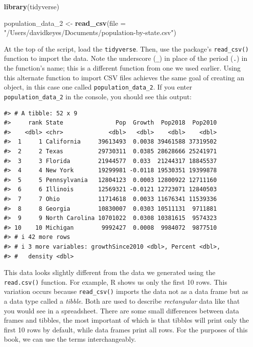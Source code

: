 \documentclass[
]{book}
\newenvironment{Shaded}{\begin{snugshade}}{\end{snugshade}}
\newcommand{\AttributeTok}[1]{\textcolor[rgb]{0.13,0.29,0.53}{#1}}
\newcommand{\FunctionTok}[1]{\textcolor[rgb]{0.13,0.29,0.53}{\textbf{#1}}}
\newcommand{\NormalTok}[1]{#1}
\newcommand{\OtherTok}[1]{\textcolor[rgb]{0.56,0.35,0.01}{#1}}
\newcommand{\StringTok}[1]{\textcolor[rgb]{0.31,0.60,0.02}{#1}}
\begin{document}
\begin{Shaded}
\begin{Highlighting}[]
\FunctionTok{library}\NormalTok{(tidyverse)}

\NormalTok{population\_data\_2 }\OtherTok{\textless{}{-}} \FunctionTok{read\_csv}\NormalTok{(}\AttributeTok{file =} \StringTok{"/Users/davidkeyes/Documents/population{-}by{-}state.csv"}\NormalTok{)}
\end{Highlighting}
\end{Shaded}

At the top of the script, load the \texttt{tidyverse}. Then, use the package's \texttt{read\_csv()} function to import the data. Note the underscore (\texttt{\_}) in place of the period (\texttt{.}) in the function's name; this is a different function from one we used earlier. Using this alternate function to import CSV files achieves the same goal of creating an object, in this case one called \texttt{population\_data\_2}. If you enter \texttt{population\_data\_2} in the console, you should see this output:

\begin{verbatim}
#> # A tibble: 52 x 9
#>     rank State               Pop  Growth  Pop2018  Pop2010
#>    <dbl> <chr>             <dbl>   <dbl>    <dbl>    <dbl>
#>  1     1 California     39613493  0.0038 39461588 37319502
#>  2     2 Texas          29730311  0.0385 28628666 25241971
#>  3     3 Florida        21944577  0.033  21244317 18845537
#>  4     4 New York       19299981 -0.0118 19530351 19399878
#>  5     5 Pennsylvania   12804123  0.0003 12800922 12711160
#>  6     6 Illinois       12569321 -0.0121 12723071 12840503
#>  7     7 Ohio           11714618  0.0033 11676341 11539336
#>  8     8 Georgia        10830007  0.0303 10511131  9711881
#>  9     9 North Carolina 10701022  0.0308 10381615  9574323
#> 10    10 Michigan        9992427  0.0008  9984072  9877510
#> # i 42 more rows
#> # i 3 more variables: growthSince2010 <dbl>, Percent <dbl>,
#> #   density <dbl>
\end{verbatim}

This data looks slightly different from the data we generated using the \texttt{read.csv()} function. For example, R shows us only the first 10 rows. This variation occurs because \texttt{read\_csv()} imports the data not as a data frame but as a data type called a \emph{tibble}. Both are used to describe \emph{rectangular} data like that you would see in a spreadsheet. There are some small differences between data frames and tibbles, the most important of which is that tibbles will print only the first 10 rows by default, while data frames print all rows. For the purposes of this book, we can use the terms interchangeably.
\end{document}
